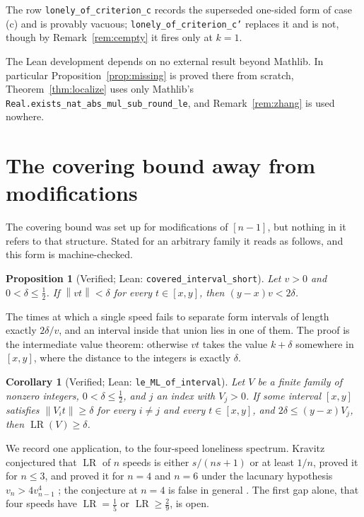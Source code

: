 \documentclass[11pt]{amsart}
\theoremstyle{plain}
\newtheorem{proposition}[theorem]{Proposition}
\newtheorem{corollary}[theorem]{Corollary}
\theoremstyle{definition}
\newcommand{\LR}{\operatorname{LR}}
\newcommand{\nrm}[1]{\left\lVert #1 \right\rVert}
\begin{document}
The row \texttt{lonely\_of\_criterion\_c} records the superseded one-sided form of case (c) and is
provably vacuous; \texttt{lonely\_of\_criterion\_c'} replaces it and is not, though by
Remark~\ref{rem:cempty} it fires only at $k=1$.

The Lean development depends on no external result beyond Mathlib. In particular
Proposition~\ref{prop:missing} is proved there from scratch, Theorem~\ref{thm:localize} uses only
Mathlib's \texttt{Real.exists\_nat\_abs\_mul\_sub\_round\_le}, and Remark~\ref{rem:zhang} is used
nowhere.

\section{The covering bound away from modifications}\label{sec:beyond}

The covering bound was set up for modifications of $[n-1]$, but nothing in it refers to that
structure. Stated for an arbitrary family it reads as follows, and this form is machine-checked.

\begin{proposition}[Verified; Lean: \texttt{covered\_interval\_short}]\label{prop:short}
Let $v>0$ and $0<\delta\le\tfrac12$. If $\nrm{vt}<\delta$ for every $t\in[x,y]$, then
$(y-x)v<2\delta$.
\end{proposition}

The times at which a single speed fails to separate form intervals of length exactly $2\delta/v$,
and an interval inside that union lies in one of them. The proof is the intermediate value theorem:
otherwise $vt$ takes the value $k+\delta$ somewhere in $[x,y]$, where the distance to the integers is
exactly $\delta$.

\begin{corollary}[Verified; Lean: \texttt{le\_ML\_of\_interval}]\label{cor:mlbound}
Let $V$ be a finite family of nonzero integers, $0<\delta\le\tfrac12$, and $j$ an index with
$V_j>0$. If some interval $[x,y]$ satisfies $\nrm{V_it}\ge\delta$ for every $i\ne j$ and every
$t\in[x,y]$, and $2\delta\le(y-x)V_j$, then $\LR(V)\ge\delta$.
\end{corollary}

We record one application, to the four-speed loneliness spectrum. Kravitz \cite{kravitz} conjectured
that $\LR$ of $n$ speeds is either $s/(ns+1)$ or at least $1/n$, proved it for $n\le3$, and proved it
for $n=4$ and $n=6$ under the lacunary hypothesis $v_n>4v_{n-1}^{4}$ \cite[Thm.~2.2]{kravitz}; the
conjecture at $n=4$ is false in general \cite{fansun}. The first gap
alone, that four speeds have $\LR=\tfrac15$ or $\LR\ge\tfrac29$, is open.
\end{document}
